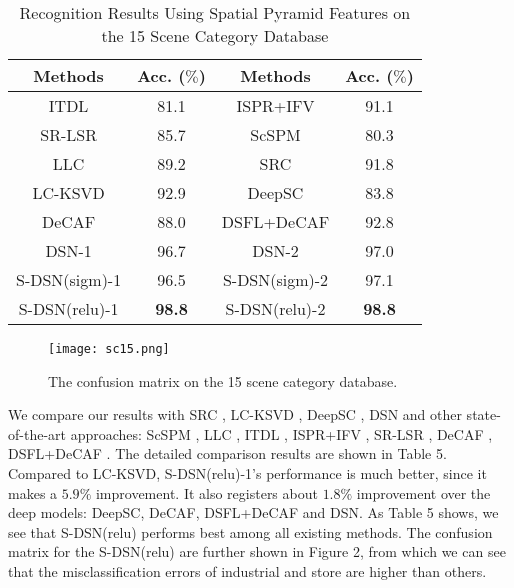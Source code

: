 \documentclass[letterpaper]{article}
\begin{document}
\begin{table}[t]
\small{\caption{Recognition Results Using Spatial Pyramid Features on the 15 Scene Category Database}}
\label{tab:resultsc15}
\begin{center}
\small{
\begin{tabular}{c|c|c|c}
\hline
Methods       &    Acc. ($\%$) &  Methods        &  Acc. ($\%$)  \\
\hline
ITDL          &   81.1             & ISPR+IFV        &   91.1    \\
SR-LSR        &   85.7             & ScSPM           &   80.3    \\
LLC           &   89.2             & SRC             &   91.8    \\
LC-KSVD       &   92.9             & DeepSC          &   83.8    \\
DeCAF         &   88.0             & DSFL+DeCAF      &   92.8    \\
DSN-1         &   96.7             & DSN-2           &   97.0    \\
\hline
S-DSN(sigm)-1      &   96.5             & S-DSN(sigm)-2        &  97.1    \\
S-DSN(relu)-1      &   \textbf{98.8}    & S-DSN(relu)-2        &  \textbf{98.8}    \\
\hline
\end{tabular}}
\end{center}
\vskip -0.2in
\end{table}

\begin{figure}[ht]
\begin{center}
\centerline{\texttt{[image: sc15.png]}}
\vskip -0.15in
\small{\caption{The confusion matrix on the 15 scene category database.}}
\label{fig:cmsc15}
\end{center}
\vskip -0.35in
\end{figure}


We compare our results with SRC \cite{Wright2009}, LC-KSVD \cite{Jiang2013}, DeepSC \cite{He2014}, DSN \cite{Deng2011b} and other state-of-the-art approaches: ScSPM \cite{Yangjc2009}, LLC \cite{Wang2010}, ITDL \cite{Qiu2014}, ISPR+IFV \cite{Lin2014}, SR-LSR \cite{Lix2014}, DeCAF \cite{Donahue2014}, DSFL+DeCAF \cite{Zuo2014}. The detailed comparison results are shown in Table 5. Compared to LC-KSVD, S-DSN(relu)-1's performance is much better, since it makes a $5.9\%$ improvement. It also registers about $1.8\%$ improvement over the deep models: DeepSC, DeCAF, DSFL+DeCAF and DSN. As Table 5 shows, we see that S-DSN(relu) performs best among all existing methods. The confusion matrix for the S-DSN(relu) are further shown in Figure 2, from which we can see that the misclassification errors of industrial and store are higher than others.
\end{document}
